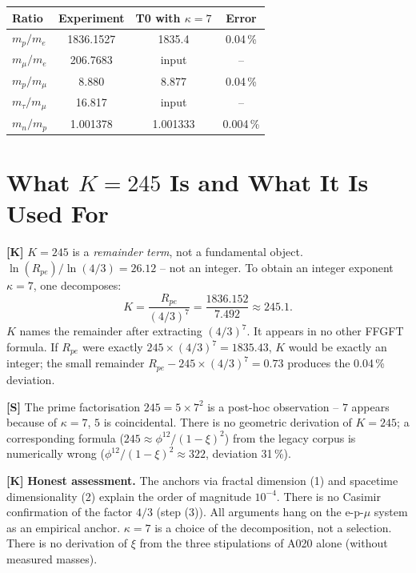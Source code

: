 \begin{center}
\renewcommand{\arraystretch}{1.3}
{\small
\begin{tabular}{lccc}
\toprule
Ratio & Experiment & T0 with $\kappa=7$ & Error \\
\midrule
$m_p/m_e$       & 1836{.}1527 & 1835{.}4 & 0{.}04\,\% \\
$m_\mu/m_e$     & 206{.}7683  & input & -- \\
$m_p/m_\mu$     & 8{.}880     & 8{.}877 & 0{.}04\,\% \\
$m_\tau/m_\mu$  & 16{.}817    & input & -- \\
$m_n/m_p$       & 1{.}001378  & 1{.}001333 & 0{.}004\,\% \\
\bottomrule
\end{tabular}
}
\renewcommand{\arraystretch}{1.0}
\end{center}

\section{What $K = 245$ Is and What It Is Used For}

\textbf{[K]} $K=245$ is a \emph{remainder term}, not a fundamental object.
$\ln(R_{pe})/\ln(4/3) = 26{.}12$ -- not an integer. To obtain an integer
exponent $\kappa=7$, one decomposes:
\[
  K = \frac{R_{pe}}{(4/3)^7}
  = \frac{1836{.}152}{7{.}492} \approx 245{.}1.
\]
$K$ names the remainder after extracting $(4/3)^7$. It appears in no other
FFGFT formula. If $R_{pe}$ were exactly $245\times(4/3)^7=1835{.}43$,
$K$ would be exactly an integer; the small remainder $R_{pe}-245\times(4/3)^7=0{.}73$
produces the 0{.}04\,\% deviation.

\textbf{[S]} The prime factorisation $245=5\times7^2$ is a post-hoc
observation -- $7$ appears because of $\kappa=7$, $5$ is coincidental.
There is no geometric derivation of $K=245$; a corresponding formula
($245\approx\phi^{12}/(1-\xi)^2$) from the legacy corpus is numerically
wrong ($\phi^{12}/(1-\xi)^2\approx322$, deviation 31\,\%).

\textbf{[K]} \textbf{Honest assessment.} The anchors via fractal dimension (1)
and spacetime dimensionality (2) explain the order of magnitude $10^{-4}$.
There is no Casimir confirmation of the factor $4/3$ (step (3)). All arguments
hang on the e-p-$\mu$ system as an empirical anchor. $\kappa=7$ is a choice of
the decomposition, not a selection. There is no derivation of $\xi$ from the
three stipulations of A020 alone (without measured masses).

